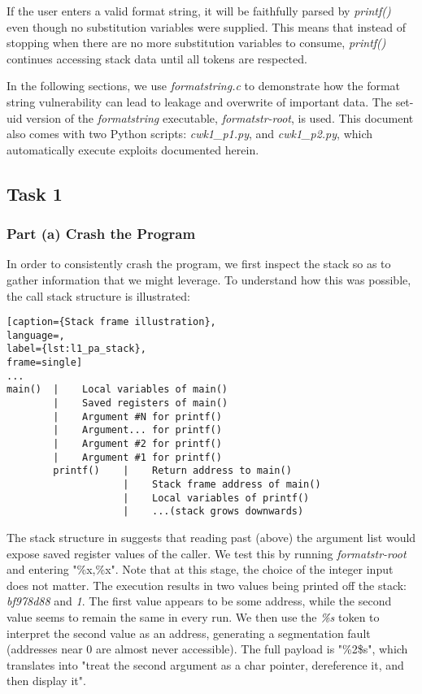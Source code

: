 If the user enters a valid format string, it will be faithfully parsed by \emph{printf()} even though no substitution variables were supplied. This means that instead of  stopping when there are no more substitution variables to consume, \emph{printf()} continues accessing stack data until all tokens are respected.

In the following sections, we use \emph{formatstring.c} to demonstrate how the format string vulnerability can lead to leakage and overwrite of important data. The set-uid version of the \emph{formatstring} executable, \emph{formatstr-root}, is used. This document also comes with two Python scripts: \emph{cwk1\_p1.py}, and \emph{cwk1\_p2.py}, which automatically execute exploits documented herein.

\subsection{Task 1}
\subsubsection{Part (a) Crash the Program}
In order to consistently crash the program, we first inspect the stack so as to gather information that we might leverage. To understand how this was possible, the call stack structure is illustrated:

\begin{minipage}{\linewidth}
\begin{lstlisting}[caption={Stack frame illustration},
language=,
label={lst:l1_pa_stack},
frame=single]
...
main()  |    Local variables of main()
        |    Saved registers of main()
        |    Argument #N for printf()
        |    Argument... for printf()
        |    Argument #2 for printf()
        |    Argument #1 for printf()
        printf()    |    Return address to main()
                    |    Stack frame address of main()
                    |    Local variables of printf()
                    |    ...(stack grows downwards)
\end{lstlisting}
\end{minipage}

The stack structure in  suggests that reading past (above) the argument list would expose saved register values of the caller. We test this by running \emph{formatstr-root} and entering "\%x,\%x". Note that at this stage, the choice of the integer input does not matter. The execution results in two values being printed off the stack: \emph{bf978d88} and \emph{1}. The first value appears to be some address, while the second value seems to remain the same in every run. We then use the \emph{\%s} token to interpret the second value as an address, generating a segmentation fault (addresses near 0 are almost never accessible). The full payload is "\%2\$s", which translates into "treat the second argument as a char pointer, dereference it, and then display it".

